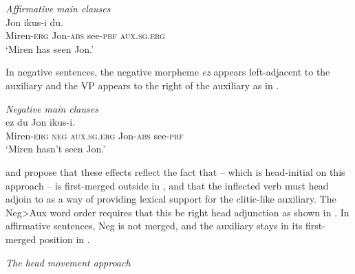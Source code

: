 \documentclass[output=paper]{langscibook}
\begin{document}
\ea \label{ex:haddican:30} \textit{{Affirmative main clauses}} \protect\label{affirmativeclauses}\\
   {Jon} {ikus-i}      {du.}   \\				
      Miren-\textsc{erg} Jon-\textsc{abs} see-\textsc{prf}   \textsc{aux}.\textsc{sg.erg} \\
\glt `Miren has seen Jon.'
\z
 
In negative sentences, the negative morpheme \textit{ez} appears left-adjacent to the auxiliary and the VP appears to the right of the auxiliary as in .\largerpage[2]

\ea \label{ex:haddican:31} \textit{{Negative main clauses}}\protect\label{negativeclauses}\\
   {ez}     {du}   {Jon} {ikus-i.} 	\\			
      Miren-\textsc{erg} \textsc{neg} \textsc{aux}.\textsc{sg.erg} Jon-\textsc{abs} see-\textsc{prf} \\
\glt      `Miren hasn't seen Jon.'
\z 

\citet{Laka1990} and \citet{elordieta2001, elordieta2008} propose that these  effects reflect the fact that  -- which is head-initial on this approach -- is first-merged outside  in , and that the inflected verb must head adjoin to  as a way of providing lexical support for the clitic-like auxiliary. The Neg>Aux word order requires that this be right head adjunction as shown in .  In affirmative sentences, Neg is not merged, and the auxiliary stays in its first-merged position in .  
 
\ea \label{ex:haddican:32} \textit{The head movement approach \citep{Laka1990}} \label{tree-2} \\ 
 
\z
  
\end{document}
